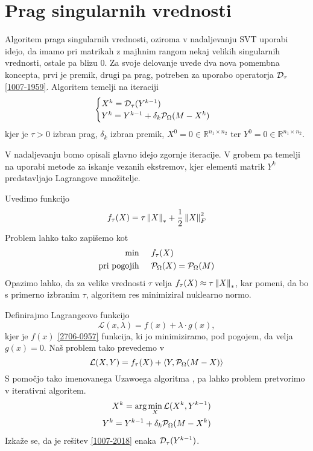\section{Prag singularnih vrednosti}
Algoritem praga singularnih vrednosti, oziroma v nadaljevanju SVT uporabi idejo, da imamo pri matrikah z majhnim rangom nekaj velikih singularnih vrednosti, ostale pa blizu 0. Za svoje delovanje uvede dva nova pomembna koncepta, prvi je premik, drugi pa prag, potreben za uporabo operatorja $\mathcal{D}_\tau$ \eqref{1007-1959}. Algoritem temelji na iteraciji
\[
    \begin{cases}
        X^k = \mathcal{D}_\tau(Y^{k-1}) \\
        Y^k = Y^{k-1} + \delta_k \mathcal{P}_\Omega(M - X^k) 
    \end{cases}
\]
kjer je $\tau > 0$ izbran prag, $\delta_k$ izbran premik, $X^0 = 0 \in \mathbb{R}^{n_1 \times n_2}$ ter
$Y^0 = 0 \in \mathbb{R}^{n_1 \times n_2}$. \cite{CCS}

V nadaljevanju bomo opisali glavno idejo zgornje iteracije. V grobem pa temelji na uporabi metode za iskanje vezanih ekstremov, kjer elementi matrik $Y^k$ predstavljajo Lagrangove množitelje. 

Uvedimo funkcijo 
\begin{align}
    \label{1007-2007}
    f_\tau(X) = \tau\left\lVert X\right\rVert_* + \frac{1}{2}\left\lVert X\right\rVert_F^2
\end{align}
Problem lahko tako zapišemo kot 
\begin{align}
\label{2706-0957}
\begin{split}
    \textrm{min} & \hspace{0.5cm} f_\tau(X) \\
    \textrm{pri pogojih} & \hspace{0.5cm} \mathcal{P}_\Omega(X) = \mathcal{P}_\Omega(M)
\end{split}
\end{align}
Opazimo lahko, da za velike vrednosti $\tau$ velja $f_\tau(X) \approx \tau\left\lVert X\right\rVert_*$, kar pomeni, da bo s primerno izbranim $\tau$, algoritem res minimiziral nuklearno normo.

Definirajmo Lagrangeovo funkcijo 
\[\mathcal{L}(x, \lambda) = f(x) + \lambda \cdot g(x),\]
kjer je $f(x)$ \eqref{2706-0957} funkcija, ki jo minimiziramo, pod pogojem, da velja $g(x) = 0$. Naš problem tako prevedemo v
\[
    \mathcal{L}(X, Y) = f_\tau(X) + \left< Y, \mathcal{P}_\Omega(M - X) \right>
\] 
S pomočjo tako imenovanega Uzawoega algoritma \cite{CCS}, pa lahko problem pretvorimo v iterativni algoritem. 
\begin{align}
        X^k =  \arg \min_{X} \mathcal{L}(X^k, Y^{k-1}) \label{1007-2018}\\
        Y^k = Y^{k-1} + \delta_k \mathcal{P}_\Omega(M - X^k) \label{1007-2019}
\end{align}
Izkaže se, da je rešitev \eqref{1007-2018} enaka $\mathcal{D}_\tau(Y^{k-1})$.

